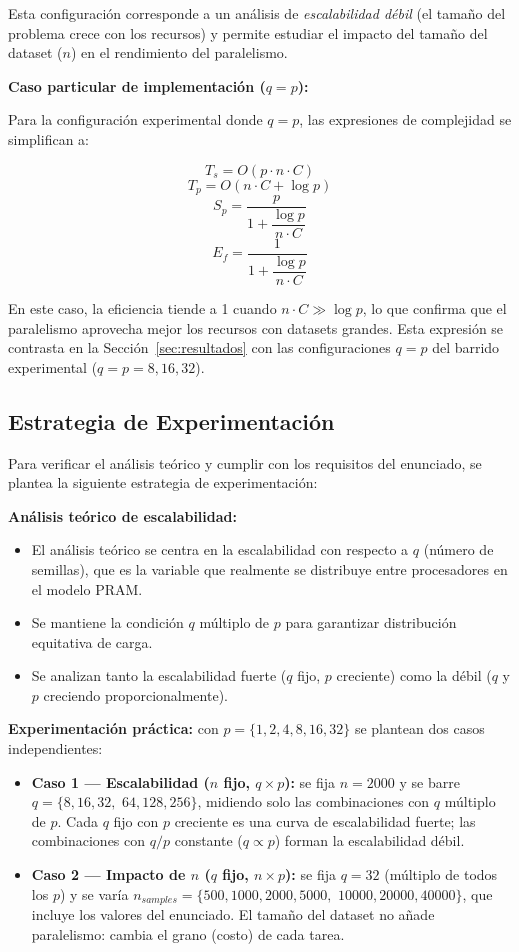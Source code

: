\documentclass[11pt, a4paper]{article}
\begin{document}
Esta configuración corresponde a un análisis de \textit{escalabilidad débil} (el tamaño del problema crece con los recursos) y permite estudiar el impacto del tamaño del dataset ($n$) en el rendimiento del paralelismo.

\textbf{Caso particular de implementación ($q = p$):}

Para la configuración experimental donde $q = p$, las expresiones de complejidad se simplifican a:

$$T_s = O(p \cdot n \cdot C)$$
$$T_p = O(n \cdot C + \log p)$$
$$S_p = \frac{p}{1 + \dfrac{\log p}{n \cdot C}}$$
$$E_f = \frac{1}{1 + \dfrac{\log p}{n \cdot C}}$$

En este caso, la eficiencia tiende a 1 cuando $n \cdot C \gg \log p$, lo que confirma que el paralelismo aprovecha mejor los recursos con datasets grandes. Esta expresión se contrasta en la Sección~\ref{sec:resultados} con las configuraciones $q = p$ del barrido experimental ($q = p = 8, 16, 32$).





\subsection{Estrategia de Experimentación}

Para verificar el análisis teórico y cumplir con los requisitos del enunciado, se plantea la siguiente estrategia de experimentación:

\textbf{Análisis teórico de escalabilidad:}
\begin{itemize}
    \item El análisis teórico se centra en la escalabilidad con respecto a $q$ (número de semillas), que es la variable que realmente se distribuye entre procesadores en el modelo PRAM.
    \item Se mantiene la condición $q$ múltiplo de $p$ para garantizar distribución equitativa de carga.
    \item Se analizan tanto la escalabilidad fuerte ($q$ fijo, $p$ creciente) como la débil ($q$ y $p$ creciendo proporcionalmente).
\end{itemize}

\textbf{Experimentación práctica:} con $p = \{1, 2, 4, 8, 16, 32\}$ se plantean dos casos independientes:
\begin{itemize}
    \item \textbf{Caso 1 --- Escalabilidad ($n$ fijo, $q \times p$):} se fija $n = 2000$ y se barre $q = \{8, 16, 32,$ $64, 128, 256\}$, midiendo solo las combinaciones con $q$ múltiplo de $p$. Cada $q$ fijo con $p$ creciente es una curva de escalabilidad fuerte; las combinaciones con $q/p$ constante ($q \propto p$) forman la escalabilidad débil.
    \item \textbf{Caso 2 --- Impacto de $n$ ($q$ fijo, $n \times p$):} se fija $q = 32$ (múltiplo de todos los $p$) y se varía $n_{samples} = \{500, 1000, 2000, 5000,$ $10000, 20000, 40000\}$, que incluye los valores del enunciado. El tamaño del dataset no añade paralelismo: cambia el grano (costo) de cada tarea.
\end{itemize}
\end{document}
